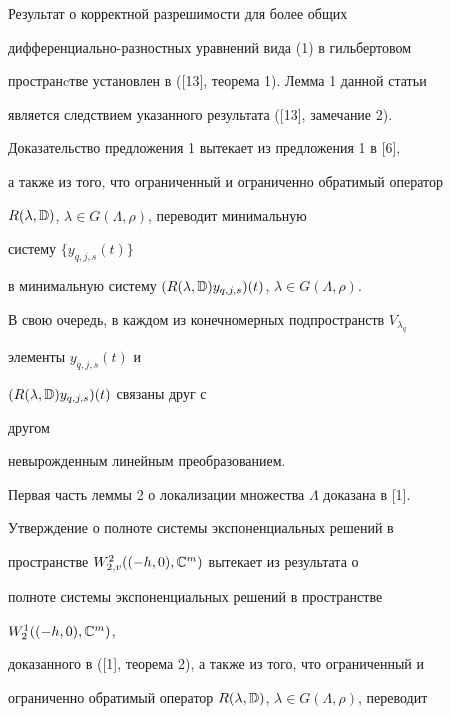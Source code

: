  


Результат о корректной разрешимости для более общих 


дифференциально-разностных уравнений вида (1) в гильбертовом 


пространcтве установлен в ([13], теорема 1). Лемма 1 данной статьи 


является следствием указанного результата ([13], замечание 2). 


 


Доказательство предложения 1 вытекает из предложения 1 в [6], 


а также из того, что ограниченный и ограниченно обратимый оператор 


$R(\lambda,\Bbb D)$, $\lambda\in G(\Lambda,\rho)$, переводит минимальную 


систему $\{y_{q,j,s}(t)\}$ 


в минимальную систему $(R(\lambda,\Bbb D)y_{q,j,s})(t)$, $\lambda\in 


G(\Lambda,\rho)$. 


 


В свою очередь, в каждом из конечномерных подпространств $V_{\lambda_q}$ 


элементы $y_{q,j,s}(t)$ и \linebreak


$(R(\lambda,\Bbb D)y_{q,j,s})(t)$ связаны друг с 


другом 


невырожденным линейным преобразованием. 


 


Первая часть леммы 2 о локализации множества $\Lambda$ доказана в [1]. 


 


Утверждение о полноте системы экспоненциальных решений в 


пространстве $W^{2}_{2,v}((-h,0),\Bbb C^m)$ вытекает из результата о 


полноте системы экспоненциальных решений в пространстве \linebreak


$W^{1}_{2}((-h,0),\Bbb C^m)$, 


доказанного в ([1], теорема 2), а также из того, что ограниченный и 


ограниченно обратимый оператор $R(\lambda,\Bbb D)$, $\lambda\in 


G(\Lambda,\rho)$, переводит 


